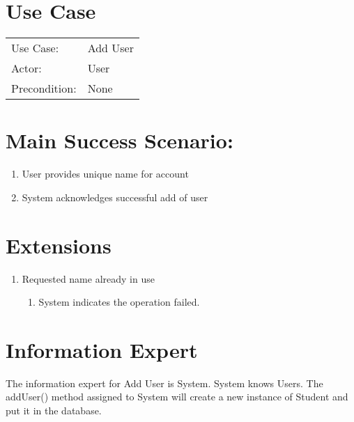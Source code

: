 \documentclass{article}
\begin{document}
\section*{Use Case}

\begin{tabular}{l l}
Use Case:     & Add User \\
Actor:        & User \\
Precondition: & None \\
\end{tabular}

\section*{Main Success Scenario:}

\begin{enumerate}
    \item User provides unique name for account
    \item System acknowledges successful add of user
\end{enumerate}

\section*{Extensions}

\begin{enumerate}
    \item Requested name already in use
    \begin{enumerate}
        \item System indicates the operation failed.
    \end{enumerate}
\end{enumerate}

\section*{Information Expert}

The information expert for Add User is System.
System knows Users.
The addUser() method assigned to System will create a new instance of Student and put it in the database.

\pagebreak
\end{document}
